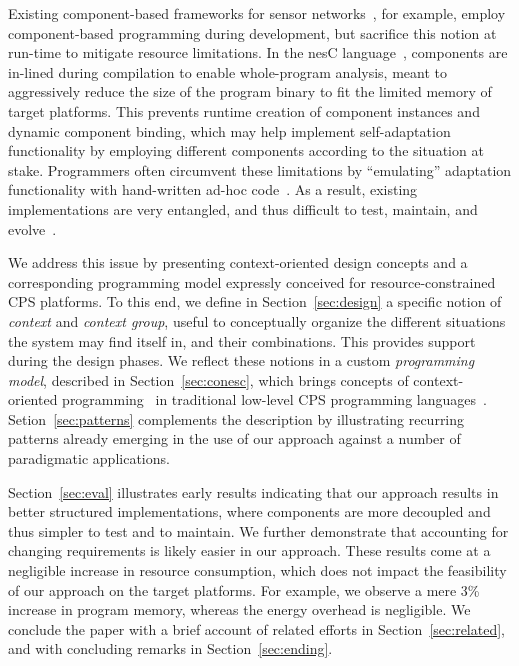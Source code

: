 Existing component-based frameworks for sensor
networks~\cite{mottola10:survey}, for example, employ component-based
programming during development, but sacrifice this notion at run-time
to mitigate resource limitations. In the nesC
language~\cite{gay03nesc}, components are in-lined during compilation
to enable whole-program analysis, meant to aggressively reduce the
size of the program binary to fit the limited memory of target
platforms. This prevents runtime creation of component instances and
dynamic component binding, which may help implement self-adaptation
functionality by employing different components according to the
situation at stake. Programmers often circumvent these limitations by
``emulating'' adaptation functionality with hand-written ad-hoc
code~\cite{mottola10:survey}. As a result, existing implementations
are very entangled, and thus difficult to test, maintain, and
evolve~\cite{Picco:2010:SEW:1882362.1882421}.

We address this issue by presenting context-oriented design concepts
and a corresponding programming model expressly conceived for
resource-constrained CPS platforms. To this end, we define in
Section~\ref{sec:design} a specific notion of \emph{context} and
\emph{context group}, useful to conceptually organize the different
situations the system may find itself in, and their combinations. This
provides support during the design phases. We reflect these notions in
a custom \emph{programming model}, described in
Section~\ref{sec:conesc}, which brings concepts of context-oriented
programming~\cite{Hirschfeld08} in traditional low-level CPS
programming languages~\cite{gay03nesc}. %
Setion~\ref{sec:patterns} complements the description by illustrating
recurring patterns already emerging in the use of our approach against
a number of paradigmatic applications.

Section~\ref{sec:eval} illustrates early results indicating that our
approach results in better structured implementations, where
components are more decoupled and thus simpler to test and to
maintain. We further demonstrate that accounting for changing
requirements is likely easier in our approach. These results come at a
negligible increase in resource consumption, which does not impact the
feasibility of our approach on the target platforms. For example, we
observe a mere 3\% increase in program memory, whereas the energy
overhead is negligible. We conclude the paper with a brief account of
related efforts in Section~\ref{sec:related}, and with concluding
remarks in Section~\ref{sec:ending}.

